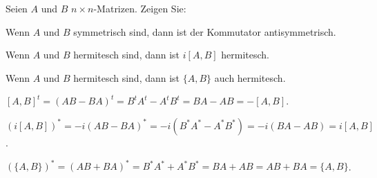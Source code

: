 Seien $A$ und $B$ $n\times n$-Matrizen. Zeigen Sie:
\begin{teilaufgaben}
\item Wenn $A$ und $B$ symmetrisch sind, dann ist der Kommutator
antisymmetrisch.
\item Wenn $A$ und $B$ hermitesch sind, dann ist $i[A,B]$ hermitesch.
\item Wenn $A$ und $B$ hermitesch sind, dann ist $\{A,B\}$ auch hermitesch.
\end{teilaufgaben}

\begin{loesung}
\begin{teilaufgaben}
\item
$[A,B]^t=(AB-BA)^t=B^tA^t-A^tB^t=BA-AB=-[A,B]$.
\item
$(i[A,B])^*=-i(AB-BA)^*=-i(B^*A^*-A^*B^*)=-i(BA-AB)=i[A,B]$.
\item
$(\{A,B\})^*=(AB+BA)^*=B^*A^*+A^*B^*=BA+AB=AB+BA=\{A,B\}$.
\end{teilaufgaben}
\end{loesung}

